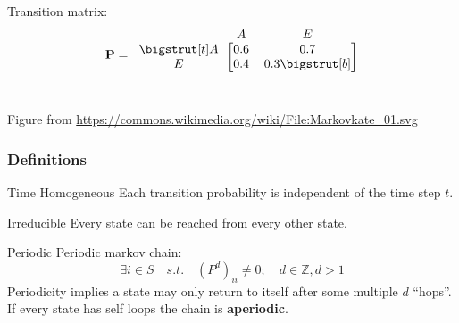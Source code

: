 \documentclass{beamer}
\begin{document}
\begin{frame}
\begin{block}{}
\begin{columns}
\begin{column}{0.5\linewidth}
\centering
Transition matrix:
\[{\bf P} =
\begin{blockarray}{ccc}
  & A & E \\
	\begin{block}{c[cc]}
		\bigstrut[t]
		A & 0.6 & 0.7 \\
		E & 0.4 & 0.3
		\bigstrut[b] \\
	\end{block}
\end{blockarray}
\]
\end{column}
\end{columns}

\begin{center}
\begin{tiny}
Figure from \url{https://commons.wikimedia.org/wiki/File:Markovkate_01.svg}
\end{tiny}
\end{center}
\end{block}

\end{frame}


\begin{frame}
\frametitle{Definitions}
\begin{block}{Time Homogeneous}
Each transition probability is independent of the time step $t$.
\end{block}

\begin{block}{Irreducible}
Every state can be reached from every other state.
\end{block}

\begin{block}{Periodic}
Periodic markov chain:
\[ \exists i \in S \quad s.t. \quad \left(P^d\right)_{ii} \neq 0; \quad d\in\mathbb{Z},d>1 \]
Periodicity implies a state may only return to itself after some multiple $d$ ``hops''.  If every state has self loops the chain is \textbf{aperiodic}.
\end{block}

\end{frame}
\end{document}
